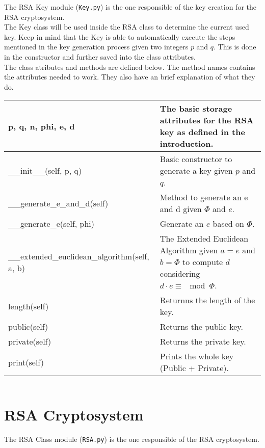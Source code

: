 \documentclass[usenames,dvipsnames,12pt]{report}
\begin{document}
The RSA Key module (\texttt{Key.py}) is the one responsible of the key creation for the RSA cryptosystem.\\

The Key class will be used inside the RSA class to determine the current used key. Keep in mind that
the Key is able to automatically execute the steps mentioned in the key generation process given
two integers $p$ and $q$. This is done in the constructor and further saved into the class attributes.\\

The class atributes and methods are defined below. The method names contains the attributes needed to work.
They also have an brief explanation of what they do.

\begin{center}
    \begin{tabular}{ | l | p{6cm} |}
    \hline
    p, q, n, phi, e, d & The basic storage attributes for the RSA key as defined in the introduction.\\ \hline
    \_\_init\_\_(self, p, q) & Basic constructor to generate a key given $p$ and $q$.\\ \hline
    \_\_generate\_e\_and\_d(self) & Method to generate an e and d given $\Phi$ and $e$.\\ \hline
    \_\_generate\_e(self, phi) & Generate an $e$ based on $\Phi$.\\ \hline
    \_\_extended\_euclidean\_algorithm(self, a, b) & The Extended Euclidean Algorithm given $a = e$ and $b = \Phi$ to compute $d$ considering $d \cdot e \equiv \mod \Phi$.\\ \hline
    length(self) & Returnns the length of the key.\\ \hline
    public(self) & Returns the public key.\\ \hline
    private(self) & Returns the private key.\\ \hline
    print(self) & Prints the whole key (Public + Private).\\
    \hline
    \end{tabular}
\end{center}

\inputminted[linenos, breaklines=true]{python}{../Python/RSA/Key.py}

\section{RSA Cryptosystem}

The RSA Class module (\texttt{RSA.py}) is the one responsible of the RSA cryptosystem.\\
\end{document}
